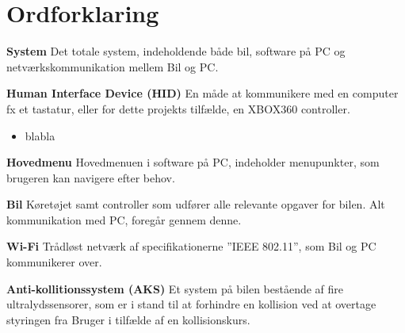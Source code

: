 
\section{Ordforklaring}

\textbf{System}
Det totale system, indeholdende både bil, software på PC og netværkskommunikation mellem Bil og PC. 

\textbf{Human Interface Device (HID)}
En måde at kommunikere med en computer fx et tastatur, eller for dette projekts tilfælde, en XBOX360 controller.

\begin{itemize}
	\item blabla
\end{itemize}

\textbf{Hovedmenu}
Hovedmenuen i software på PC, indeholder menupunkter, som brugeren kan navigere efter behov.

\textbf{Bil}
Køretøjet samt controller som udfører alle relevante opgaver for bilen. Alt kommunikation med PC, foregår gennem denne.

\textbf{Wi-Fi}
Trådløst netværk af specifikationerne ''IEEE 802.11'', som Bil og PC kommunikerer over.

\textbf{Anti-kollitionssystem (AKS)}
Et system på bilen bestående af fire ultralydssensorer, som er i stand til at forhindre en kollision ved at overtage styringen fra Bruger i tilfælde af en kollisionskurs.

\clearpage
